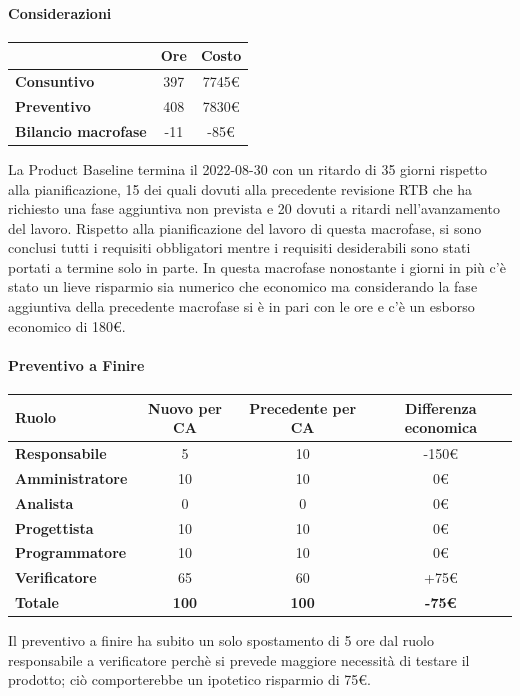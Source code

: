 \paragraph{Considerazioni} \hfill \break
\begin{center}
	\renewcommand{\arraystretch}{1.8}
	\begin{tabular}{ | l |c|c| }
    \hline
    & \textbf{Ore} & \textbf{Costo} \\
	\hline
    \textbf{Consuntivo} & 397 & 7745\euro \\
    \hline
    \textbf{Preventivo} & 408 & 7830\euro \\
    \hline
    \textbf{Bilancio macrofase} & -11 & -85\euro \\
    \hline
    \end{tabular}
\end{center}
La Product Baseline termina il 2022-08-30 con un ritardo di 35 giorni rispetto alla pianificazione, 15 dei quali dovuti alla precedente revisione RTB che ha richiesto una fase aggiuntiva non prevista e 20 dovuti a ritardi nell'avanzamento del lavoro. Rispetto alla pianificazione del lavoro di questa macrofase, si sono conclusi tutti i requisiti obbligatori mentre i requisiti desiderabili sono stati portati a termine solo in parte. In questa macrofase nonostante i giorni in più c'è stato un lieve risparmio sia numerico che economico ma considerando la fase aggiuntiva della precedente macrofase si è in pari con le ore e c'è un esborso economico di 180\euro.

\newpage
\paragraph{Preventivo a Finire} \hfill \break

\begin{center}
	\renewcommand{\arraystretch}{1.8}
	\begin{tabular}{ | l |c|c|c| }
    \hline
    \textbf{Ruolo} & \textbf{Nuovo per CA} & \textbf{Precedente per CA}  & \textbf{Differenza economica}\\
	\hline
    \textbf{Responsabile} & 5 & 10 & -150\euro \\
    \hline
    \textbf{Amministratore} & 10 & 10 & 0\euro \\
    \hline
    \textbf{Analista} & 0 & 0 & 0\euro \\
    \hline
    \textbf{Progettista} & 10 & 10 & 0\euro \\
    \hline
    \textbf{Programmatore} & 10 & 10 & 0\euro \\
    \hline
    \textbf{Verificatore} & 65 & 60 & +75\euro \\
    \hline
    \textbf{Totale} & \textbf{100} & \textbf{100} & \textbf{-75\euro} \\
    \hline
    \end{tabular}
\end{center}
Il preventivo a finire ha subito un solo spostamento di 5 ore dal ruolo responsabile a verificatore perchè si prevede maggiore necessità di testare il prodotto; ciò comporterebbe un ipotetico risparmio di 75\euro.